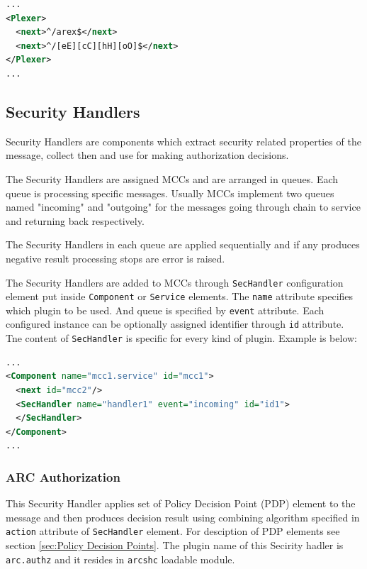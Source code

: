 \documentclass{article}
\begin{document}
\begin{lstlisting}[language=xml]
...
<Plexer>
  <next>^/arex$</next>
  <next>^/[eE][cC][hH][oO]$</next>
</Plexer>
...
\end{lstlisting}

\subsection{Security Handlers}\label{sec:Security Handlers}
Security Handlers are components which extract security related properties of
the message, collect then and use for making authorization decisions.

The Security Handlers are assigned MCCs and are arranged in queues. Each queue
is processing specific messages. Usually MCCs implement two queues named 
"incoming" and "outgoing" for the messages going through chain to service
and returning back respectively.

The Security Handlers in each queue are applied sequentially and if any
produces negative result processing stops are error is raised.

The Security Handlers are added to MCCs through \texttt{SecHandler} configuration
element put inside \texttt{Component} or \texttt{Service} elements. The
\texttt{name} attribute specifies which plugin to be used. And queue is 
specified by \texttt{event} attribute. Each configured instance can be 
optionally assigned identifier through \texttt{id} attribute. Tne content
of \texttt{SecHandler} is specific for every kind of plugin.
Example is below:
\begin{lstlisting}[language=xml]
...
<Component name="mcc1.service" id="mcc1">
  <next id="mcc2"/>
  <SecHandler name="handler1" event="incoming" id="id1">
  </SecHandler>
</Component>
...
\end{lstlisting}


\subsubsection{ARC Authorization}\label{sec:arcauthz-shc}
This Security Handler applies set of Policy Decision Point (PDP) element to the
message and then produces decision result using combining algorithm specified in 
\texttt{action} attribute of \texttt{SecHandler} element. For desciption of PDP
elements see section \ref{sec:Policy Decision Points}. The plugin name of this 
Secirity hadler is \texttt{arc.authz} and it resides in \texttt{arcshc} loadable module.
\end{document}
